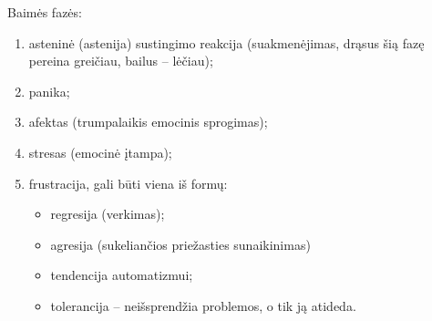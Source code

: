 

Baimės fazės:

\begin{enumerate}
  \item asteninė (\gls{astenija}) sustingimo reakcija (suakmenėjimas, 
    drąsus šią fazę pereina greičiau, bailus – lėčiau);
  \item panika;
  \item afektas (trumpalaikis emocinis sprogimas);
  \item stresas (emocinė įtampa);
  \item \gls{frustracija}, gali būti viena iš formų:
    \begin{itemize}
      \item \gls{regresija} (verkimas);
      \item agresija (sukeliančios priežasties sunaikinimas)
      \item tendencija automatizmui;
      \item tolerancija – neišsprendžia problemos, o tik ją atideda.
    \end{itemize}
\end{enumerate}
